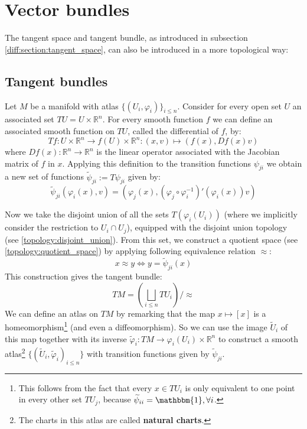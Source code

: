 \section{Vector bundles}
	The tangent space and tangent bundle, as introduced in subsection \ref{diff:section:tangent_space}, can also be introduced in a more topological way:
	
\subsection{Tangent bundles}

	\begin{construct}
		Let $M$ be a manifold with atlas $\{(U_i, \varphi_i)\}_{i\leq n}$. Consider for every open set $U$ an associated set $TU = U\times\mathbb{R}^n$. For every smooth function $f$ we can define an associated smooth function on $TU$, called the differential of $f$, by:
		\begin{equation}
			\label{diff:manifolds:T_function}
			Tf:U\times\mathbb{R}^n\rightarrow f(U)\times\mathbb{R}^n:(x, v)\mapsto(f(x), Df(x)v)
		\end{equation}
		where $Df(x):\mathbb{R}^n\rightarrow\mathbb{R}^n$ is the linear operator associated with the Jacobian matrix of $f$ in $x$. Applying this definition to the transition functions $\psi_{ji}$ we obtain a new set of functions $\widetilde{\psi}_{ji} := T\psi_{ji}$ given by:
		\begin{equation}
			\widetilde{\psi}_{ji}(\varphi_i(x), v) = \left(\varphi_j(x), (\varphi_j\circ\varphi_i^{-1})'(\varphi_i(x))v\right)
		\end{equation}
		
		Now we take the disjoint union of all the sets $T(\varphi_i(U_i))$ (where we implicitly consider the restriction to $U_i\cap U_j$), equipped with the disjoint union topology (see \ref{topology:disjoint_union}). From this set, we construct a quotient space (see \ref{topology:quotient_space}) by applying following equivalence relation $\approx$:
		\begin{equation}
			x\approx y\iff y = \widetilde{\psi}_{ji}(x)
		\end{equation}		
		This construction gives the tangent bundle:
		\begin{equation}
			\label{diff:manifolds:tangent_bundle_2}
			TM = \left(\bigsqcup_{i\leq n} TU_i\right)/\approx
		\end{equation}
		We can define an atlas on $TM$ by remarking that the map $x\mapsto[x]$ is a homeomorphism\footnote{This follows from the fact that every $x\in TU_i$ is only equivalent to one point in every other set $TU_j$, because $\widetilde{\psi}_{ii} = \mathbbm{1}, \forall i$.} (and even a diffeomorphism). So we can use the image $\widetilde{U}_i$ of this map together with its inverse $\widetilde{\varphi}_i:TM\rightarrow\varphi_i(U_i)\times\mathbb{R}^n$ to construct a smooth atlas\footnote{The charts in this atlas are called \textbf{natural charts}.} $\{(\widetilde{U}_i, \widetilde{\varphi}_i)_{i\leq n}\}$ with transition functions given by $\widetilde{\psi}_{ji}$.
		

\end{construct}
